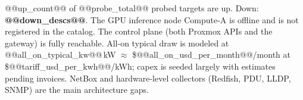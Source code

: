 @@up_count@@ of @@probe_total@@ probed targets are up. Down: \textcolor{accent}{\textbf{@@down_descs@@}}.
The GPU inference node Compute-A is offline and is not registered in the
catalog. The control plane (both Proxmox APIs and the gateway) is fully
reachable. All-on typical draw is modeled at
@@all_on_typical_kw@@\,kW $\approx$
\$@@all_on_usd_per_month@@/month at \$@@tariff_usd_per_kwh@@/kWh; capex is
seeded largely with estimates pending invoices. NetBox and hardware-level
collectors (Redfish, PDU, LLDP, SNMP) are the main architecture gaps.
